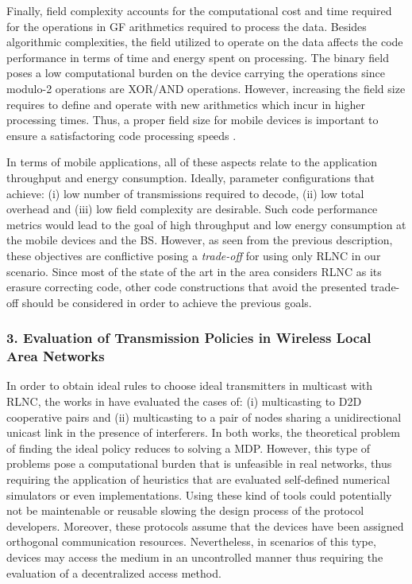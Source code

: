 Finally, field complexity accounts for the computational cost and time required for the operations in \ac{GF} arithmetics required to process the data. Besides algorithmic complexities, the field utilized to operate on the data affects the code performance in terms of time and energy spent on processing. The binary field poses a low computational burden on the device carrying the operations since modulo-2 operations are XOR/AND operations. However, increasing the field size requires to define and operate with new arithmetics which incur in higher processing times. Thus, a proper field size for mobile devices is important to ensure a satisfactoring code processing speeds \cite{heide2009network,paramanathan2013lean}.

In terms of mobile applications, all of these aspects relate to the application throughput and energy consumption. Ideally, parameter configurations that achieve: (i) low number of transmissions required to decode, (ii) low total overhead and (iii) low field complexity are desirable. Such code performance metrics would lead to the goal of high throughput and low energy consumption at the mobile devices and the \ac{BS}. However, as seen from the previous description, these objectives are conflictive posing a \textit{trade-off} for using only \ac{RLNC} in our scenario. Since most of the state of the art in the area considers \ac{RLNC} as its erasure correcting code, other code constructions that avoid the presented trade-off should be considered in order to achieve the previous goals.

\subsubsection{3. Evaluation of Transmission Policies in Wireless Local Area Networks}
In order to obtain ideal rules to choose ideal transmitters in multicast with \ac{RLNC}, the works in \cite{khamfroush2013minimizing,khamfroush2015optimal,khamfroush2014coded} have evaluated the cases of: (i) multicasting to \ac{D2D} cooperative pairs and (ii) multicasting to a pair of nodes sharing a unidirectional unicast link in the presence of interferers. In both works, the theoretical problem of finding the ideal policy reduces to solving a \ac{MDP}. However, this type of problems pose a computational burden that is unfeasible in real networks, thus requiring the application of heuristics that are evaluated self-defined numerical simulators or even implementations. Using these kind of tools could potentially not be maintenable or reusable slowing the design process of the protocol developers. Moreover, these protocols assume that the devices have been assigned orthogonal communication resources. Nevertheless, in scenarios of this type, devices may access the medium in an uncontrolled manner thus requiring the evaluation of a decentralized access method.  

